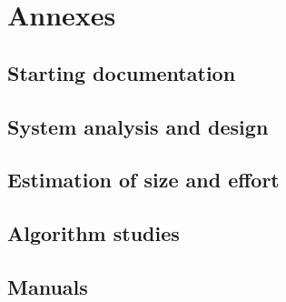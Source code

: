 \renewcommand{\documentname}{Annexes}

\chapter{Annexes}

\section{Starting documentation}
\section{System analysis and design}
\section{Estimation of size and effort}
\section{Algorithm studies}
\section{Manuals}

